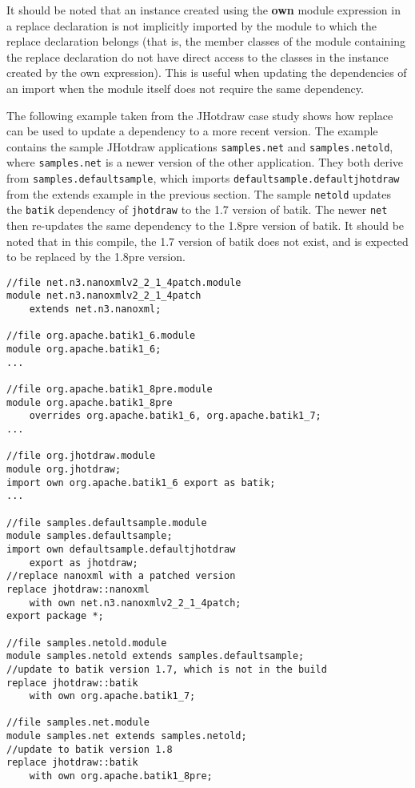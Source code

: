 It should be noted that an instance created using the \textbf{own} module expression in 
a replace declaration is not
implicitly imported by the module to which the replace declaration belongs (that is, the member
classes of the module containing the replace declaration do not have direct access to the
classes in the instance created by the own expression). This
is useful when updating the dependencies of an import when the module itself
does not require the same dependency.

The following example taken from the JHotdraw case study shows how replace can
be used to update a dependency to a more recent version. The example contains
the sample JHotdraw applications \texttt{samples.net} and \texttt{samples.netold}, 
where \texttt{samples.net} is a newer version of the other application. They both 
derive from \texttt{samples.defaultsample}, which imports \texttt{defaultsample.defaultjhotdraw} 
from the extends example in the previous section. The sample \texttt{netold} updates 
the \texttt{batik} dependency of \texttt{jhotdraw} to the 1.7 version of batik.
The newer \texttt{net} then re-updates the same dependency to the 1.8pre version of batik.
It should be noted that in this compile, the 1.7 version of batik does not exist, and
is expected to be replaced by the 1.8pre version.

\begin{lstlisting}[caption=Replace]
//file net.n3.nanoxmlv2_2_1_4patch.module
module net.n3.nanoxmlv2_2_1_4patch 
	extends net.n3.nanoxml;

//file org.apache.batik1_6.module
module org.apache.batik1_6;
...

//file org.apache.batik1_8pre.module
module org.apache.batik1_8pre 
	overrides org.apache.batik1_6, org.apache.batik1_7;
...

//file org.jhotdraw.module
module org.jhotdraw;
import own org.apache.batik1_6 export as batik;
...

//file samples.defaultsample.module
module samples.defaultsample;
import own defaultsample.defaultjhotdraw 
	export as jhotdraw;
//replace nanoxml with a patched version
replace jhotdraw::nanoxml 
	with own net.n3.nanoxmlv2_2_1_4patch;
export package *;

//file samples.netold.module
module samples.netold extends samples.defaultsample;
//update to batik version 1.7, which is not in the build
replace jhotdraw::batik 
	with own org.apache.batik1_7;

//file samples.net.module
module samples.net extends samples.netold;
//update to batik version 1.8
replace jhotdraw::batik
	with own org.apache.batik1_8pre;
\end{lstlisting}

